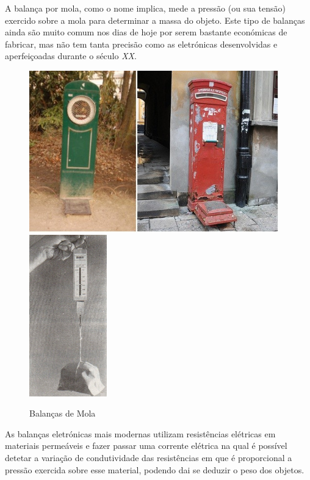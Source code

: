 A balança por mola, como o nome implica, mede a pressão (ou sua tensão) exercido sobre a mola para determinar a massa do objeto. Este tipo de balanças ainda são muito comum nos dias de hoje por serem bastante económicas de fabricar, mas não tem tanta precisão como as eletrónicas desenvolvidas e aperfeiçoadas durante o século \textit{XX}.
\newline
\newline
\begin{minipage}[!b]{\linewidth}
	\begin{figure}[H]
		\captionsetup{justification=raggedright,singlelinecheck=false}
		\flushleft
		\includegraphics[height=7cm]{./image/PESTA/general/Public_Body_Scales_1.jpg}
		\hspace{.8cm}
		\includegraphics[height=7cm]{./image/PESTA/general/Balanca_Mola_1.jpg}
		\caption{Balanças de Mola}
		\label{Balanca_Mola_1}
	\end{figure}
\end{minipage}
\newpage
As balanças eletrónicas mais modernas utilizam resistências elétricas em materiais permeáveis e fazer passar uma corrente elétrica na qual é possível detetar a variação de condutividade das resistências em que é proporcional a pressão exercida sobre esse material, podendo dai se deduzir o peso dos objetos.
